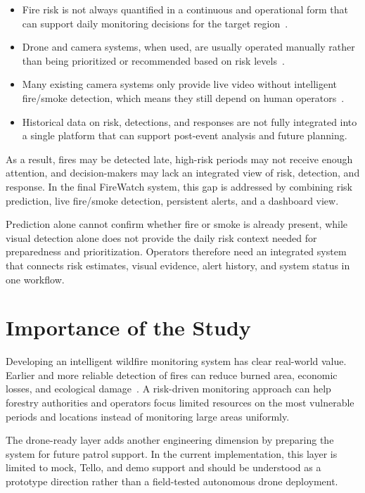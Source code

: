 \begin{itemize}
  \item Fire risk is not always quantified in a continuous and operational form
  that can support daily monitoring decisions for the target region~\cite{colak2020}.
  \item Drone and camera systems, when used, are usually operated manually
  rather than being prioritized or recommended based on risk levels~\cite{rjoub2023}.
  \item Many existing camera systems only provide live video without
  intelligent fire/smoke detection, which means they still depend on human
  operators~\cite{mohapatra2022}.
  \item Historical data on risk, detections, and responses are not fully
  integrated into a single platform that can support post-event analysis and
  future planning.
\end{itemize}

As a result, fires may be detected late, high-risk periods may not receive
enough attention, and decision-makers may lack an integrated view of risk,
detection, and response. In the final FireWatch system, this gap is addressed
by combining risk prediction, live fire/smoke detection, persistent alerts, and
a dashboard view.

Prediction alone cannot confirm whether fire or smoke is already present, while
visual detection alone does not provide the daily risk context needed for
preparedness and prioritization. Operators therefore need an integrated system
that connects risk estimates, visual evidence, alert history, and system status
in one workflow.

\section{Importance of the Study}

Developing an intelligent wildfire monitoring system has clear real-world
value. Earlier and more reliable detection of fires can reduce burned area,
economic losses, and ecological damage~\cite{mohapatra2022}. A risk-driven
monitoring approach can help forestry authorities and operators focus limited
resources on the most vulnerable periods and locations instead of monitoring
large areas uniformly.

The drone-ready layer adds another engineering dimension by preparing the
system for future patrol support. In the current implementation, this layer is
limited to mock, Tello, and demo support and should be understood as a
prototype direction rather than a field-tested autonomous drone deployment.

